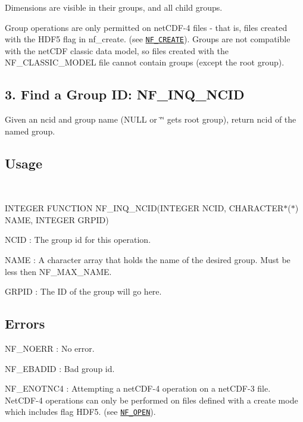 Dimensions are visible in their groups, and all child groups.

Group operations are only permitted on net\+C\+D\+F-\/4 files -\/ that is, files created with the H\+D\+F5 flag in nf\+\_\+create. (see \href{#NF_005fCREATE}{\tt N\+F\+\_\+\+C\+R\+E\+A\+TE}). Groups are not compatible with the net\+C\+DF classic data model, so files created with the N\+F\+\_\+\+C\+L\+A\+S\+S\+I\+C\+\_\+\+M\+O\+D\+EL file cannot contain groups (except the root group).\hypertarget{nc_f77_interface_guide_f77_NF-INQ-NCID}{}\subsection{3. Find a Group I\+D\+: N\+F\+\_\+\+I\+N\+Q\+\_\+\+N\+C\+I\+D }\label{nc_f77_interface_guide_f77_NF-INQ-NCID}
Given an ncid and group name (N\+U\+LL or \char`\"{}\char`\"{} gets root group), return ncid of the named group.

\subsection*{Usage }

 

I\+N\+T\+E\+G\+ER F\+U\+N\+C\+T\+I\+ON N\+F\+\_\+\+I\+N\+Q\+\_\+\+N\+C\+I\+D(\+I\+N\+T\+E\+G\+E\+R N\+C\+I\+D, C\+H\+A\+R\+A\+C\+T\+E\+R$\ast$($\ast$) N\+A\+M\+E, I\+N\+T\+E\+G\+E\+R G\+R\+P\+I\+D)

{\ttfamily N\+C\+ID} \+: The group id for this operation.

{\ttfamily N\+A\+ME} \+: A character array that holds the name of the desired group. Must be less then N\+F\+\_\+\+M\+A\+X\+\_\+\+N\+A\+ME.

{\ttfamily G\+R\+P\+ID} \+: The ID of the group will go here.

\subsection*{Errors }

{\ttfamily N\+F\+\_\+\+N\+O\+E\+RR} \+: No error.

{\ttfamily N\+F\+\_\+\+E\+B\+A\+D\+ID} \+: Bad group id.

{\ttfamily N\+F\+\_\+\+E\+N\+O\+T\+N\+C4} \+: Attempting a net\+C\+D\+F-\/4 operation on a net\+C\+D\+F-\/3 file. Net\+C\+D\+F-\/4 operations can only be performed on files defined with a create mode which includes flag H\+D\+F5. (see \href{#NF_005fOPEN}{\tt N\+F\+\_\+\+O\+P\+EN}).


